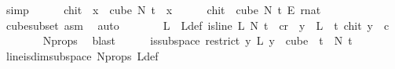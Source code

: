 \begin{isabellebody}
\ simp\isanewline
\ \ \ \ \isamarkupfalse%
\ {\isacharquery}{\kern0pt}chi{\isacharunderscore}{\kern0pt}t\ {\isacharequal}{\kern0pt}\ {\isachardoublequoteopen}{\isasymlambda}x\ {\isasymin}\ cube\ N{\isacharprime}{\kern0pt}\ t{\isachardot}{\kern0pt}\ {\isasymchi}\ x{\isachardoublequoteclose}\isanewline
\ \ \ \ \isamarkupfalse%
\ {\isachardoublequoteopen}{\isacharquery}{\kern0pt}chi{\isacharunderscore}{\kern0pt}t\ {\isasymin}\ cube\ N{\isacharprime}{\kern0pt}\ t\ {\isasymrightarrow}\isactrlsub E\ {\isacharbraceleft}{\kern0pt}{\isachardot}{\kern0pt}{\isachardot}{\kern0pt}{\isacharless}{\kern0pt}r{\isacharcolon}{\kern0pt}{\isacharcolon}{\kern0pt}nat{\isacharbraceright}{\kern0pt}{\isachardoublequoteclose}\ \isamarkupfalse%
\ cube{\isacharunderscore}{\kern0pt}subset\ asm\ \isamarkupfalse%
\ auto\isanewline
\ \ \ \ \isamarkupfalse%
\ \isamarkupfalse%
\ L\ \ L{\isacharunderscore}{\kern0pt}def{\isacharcolon}{\kern0pt}\ {\isachardoublequoteopen}is{\isacharunderscore}{\kern0pt}line\ L\ N{\isacharprime}{\kern0pt}\ t\ {\isasymand}\ {\isacharparenleft}{\kern0pt}{\isasymexists}c{\isacharless}{\kern0pt}r{\isachardot}{\kern0pt}\ \ {\isacharparenleft}{\kern0pt}{\isasymforall}y\ {\isasymin}\ L\ {\isacharbackquote}{\kern0pt}\ {\isacharbraceleft}{\kern0pt}{\isachardot}{\kern0pt}{\isachardot}{\kern0pt}{\isacharless}{\kern0pt}t{\isacharbraceright}{\kern0pt}{\isachardot}{\kern0pt}\ {\isacharquery}{\kern0pt}chi{\isacharunderscore}{\kern0pt}t\ y\ {\isacharequal}{\kern0pt}\ c{\isacharparenright}{\kern0pt}{\isacharparenright}{\kern0pt}{\isachardoublequoteclose}\ \isanewline
\ \ \ \ \ \ \isamarkupfalse%
\ N{\isacharprime}{\kern0pt}{\isacharunderscore}{\kern0pt}props\ \isamarkupfalse%
\ blast\isanewline
\isanewline
\ \ \ \ \isamarkupfalse%
\ {\isachardoublequoteopen}is{\isacharunderscore}{\kern0pt}subspace\ {\isacharparenleft}{\kern0pt}restrict\ {\isacharparenleft}{\kern0pt}{\isasymlambda}y{\isachardot}{\kern0pt}\ L\ {\isacharparenleft}{\kern0pt}y\ {}{\isacharparenright}{\kern0pt}{\isacharparenright}{\kern0pt}\ {\isacharparenleft}{\kern0pt}cube\ {}\ t{\isacharparenright}{\kern0pt}{\isacharparenright}{\kern0pt}\ {}\ N{\isacharprime}{\kern0pt}\ t{\isachardoublequoteclose}\ \isamarkupfalse%
\ line{\isacharunderscore}{\kern0pt}is{\isacharunderscore}{\kern0pt}dim{}{\isacharunderscore}{\kern0pt}subspace\ N{\isacharprime}{\kern0pt}{\isacharunderscore}{\kern0pt}props\ L{\isacharunderscore}{\kern0pt}def\ \isanewline

\end{isabellebody}
